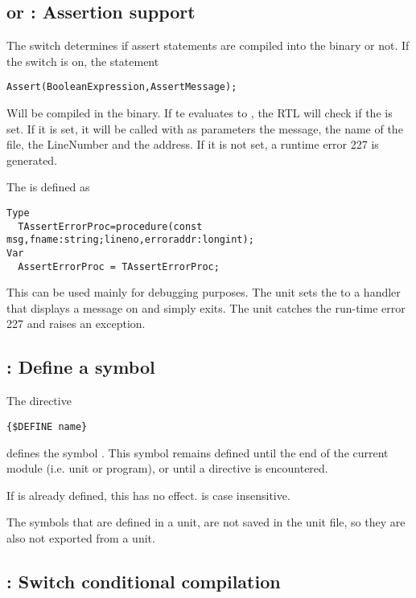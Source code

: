 \subsection{ or  : Assertion support}

The  switch determines if assert statements are
compiled into the binary or not. If the switch is on, the statement
\begin{verbatim}
Assert(BooleanExpression,AssertMessage);
\end{verbatim}
Will be compiled in the binary. If te  evaluates to
, the RTL will check if the  is set. If it
is set, it will be called with as parameters the 
message, the name of the file, the LineNumber and the address. If it is not
set, a runtime error 227 is generated.

The  is defined as
\begin{verbatim}
Type
  TAssertErrorProc=procedure(const msg,fname:string;lineno,erroraddr:longint);
Var
  AssertErrorProc = TAssertErrorProc;
\end{verbatim}
This can be used mainly for debugging purposes. The  unit sets the
 to a handler that displays a message on 
and simply exits. The  unit catches the run-time error 227
and raises an  exception.

\subsection{ : Define a symbol}

The directive
\begin{verbatim}
{$DEFINE name}
\end{verbatim}
defines the symbol . This symbol remains defined until the end of
the current module (i.e. unit or program), or until a  directive is encountered.

If  is already defined, this has no effect.  is case
insensitive.

The symbols that are defined in a unit, are not saved in the unit file,
so they are also not exported from a unit.

\subsection{ : Switch conditional compilation}

